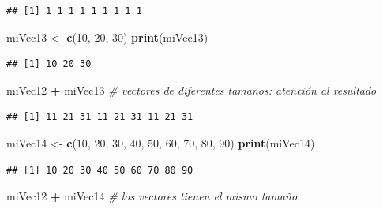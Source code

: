 \documentclass[
]{book}
\newenvironment{Shaded}{\begin{snugshade}}{\end{snugshade}}
\newcommand{\CommentTok}[1]{\textcolor[rgb]{0.56,0.35,0.01}{\textit{#1}}}
\newcommand{\DecValTok}[1]{\textcolor[rgb]{0.00,0.00,0.81}{#1}}
\newcommand{\KeywordTok}[1]{\textcolor[rgb]{0.13,0.29,0.53}{\textbf{#1}}}
\newcommand{\NormalTok}[1]{#1}
\newcommand{\OperatorTok}[1]{\textcolor[rgb]{0.81,0.36,0.00}{\textbf{#1}}}
\newcommand{\StringTok}[1]{\textcolor[rgb]{0.31,0.60,0.02}{#1}}
\begin{document}
\begin{verbatim}
## [1] 1 1 1 1 1 1 1 1 1
\end{verbatim}

\begin{Shaded}
\begin{Highlighting}[]
\NormalTok{miVec13 <-}\StringTok{ }\KeywordTok{c}\NormalTok{(}\DecValTok{10}\NormalTok{, }\DecValTok{20}\NormalTok{, }\DecValTok{30}\NormalTok{)}
\KeywordTok{print}\NormalTok{(miVec13)}
\end{Highlighting}
\end{Shaded}

\begin{verbatim}
## [1] 10 20 30
\end{verbatim}

\begin{Shaded}
\begin{Highlighting}[]
\NormalTok{miVec12 }\OperatorTok{+}\StringTok{ }\NormalTok{miVec13 }\CommentTok{# vectores de diferentes tamaños: atención al resultado}
\end{Highlighting}
\end{Shaded}

\begin{verbatim}
## [1] 11 21 31 11 21 31 11 21 31
\end{verbatim}

\begin{Shaded}
\begin{Highlighting}[]
\NormalTok{miVec14 <-}\StringTok{ }\KeywordTok{c}\NormalTok{(}\DecValTok{10}\NormalTok{, }\DecValTok{20}\NormalTok{, }\DecValTok{30}\NormalTok{, }\DecValTok{40}\NormalTok{, }\DecValTok{50}\NormalTok{, }\DecValTok{60}\NormalTok{, }\DecValTok{70}\NormalTok{, }\DecValTok{80}\NormalTok{, }\DecValTok{90}\NormalTok{)}
\KeywordTok{print}\NormalTok{(miVec14)}
\end{Highlighting}
\end{Shaded}

\begin{verbatim}
## [1] 10 20 30 40 50 60 70 80 90
\end{verbatim}

\begin{Shaded}
\begin{Highlighting}[]
\NormalTok{miVec12 }\OperatorTok{+}\StringTok{ }\NormalTok{miVec14 }\CommentTok{# los vectores tienen el mismo tamaño}
\end{Highlighting}
\end{Shaded}
\end{document}
